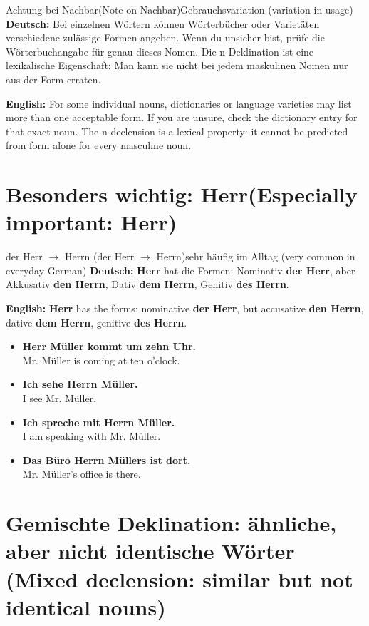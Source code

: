 \documentclass[a4paper,11pt]{article}
\newcommand{\GermanText}[1]{\textbf{Deutsch: }#1\par}
\newcommand{\EnglishText}[1]{{\small\color{SoftGray}\textbf{English: }#1\par}}
\newcommand{\ExampleItem}[2]{\item \textbf{#1}\\{\small\color{SoftGray}#2}}
\begin{document}
        \begin{grammarentry}{Achtung bei \glqq Nachbar\grqq \textnormal{(Note on \glqq Nachbar\grqq)}}{Gebrauchsvariation \textnormal{(variation in usage)}}
            \GermanText{Bei einzelnen Wörtern können Wörterbücher oder Varietäten verschiedene zulässige Formen angeben. Wenn du unsicher bist, prüfe die Wörterbuchangabe für genau dieses Nomen. Die n-Deklination ist eine lexikalische Eigenschaft: Man kann sie nicht bei jedem maskulinen Nomen nur aus der Form erraten.}
            \EnglishText{For some individual nouns, dictionaries or language varieties may list more than one acceptable form. If you are unsure, check the dictionary entry for that exact noun. The n-declension is a lexical property: it cannot be predicted from form alone for every masculine noun.}
        \end{grammarentry}

    \section{Besonders wichtig: \glqq Herr\grqq \textnormal{(Especially important: \glqq Herr\grqq)}}

        \begin{grammarentry}{der Herr $\rightarrow$ Herrn \textnormal{(der Herr $\rightarrow$ Herrn)}}{sehr häufig im Alltag \textnormal{(very common in everyday German)}}
            \GermanText{\textbf{Herr} hat die Formen: Nominativ \textbf{der Herr}, aber Akkusativ \textbf{den Herrn}, Dativ \textbf{dem Herrn}, Genitiv \textbf{des Herrn}.}
            \EnglishText{\textbf{Herr} has the forms: nominative \textbf{der Herr}, but accusative \textbf{den Herrn}, dative \textbf{dem Herrn}, genitive \textbf{des Herrn}.}
        \end{grammarentry}

        \begin{exbox}
            \begin{itemize}
                \ExampleItem{Herr Müller kommt um zehn Uhr.}{Mr. Müller is coming at ten o'clock.}
                \ExampleItem{Ich sehe Herrn Müller.}{I see Mr. Müller.}
                \ExampleItem{Ich spreche mit Herrn Müller.}{I am speaking with Mr. Müller.}
                \ExampleItem{Das Büro Herrn Müllers ist dort.}{Mr. Müller's office is there.}
            \end{itemize}
        \end{exbox}

    \section{Gemischte Deklination: ähnliche, aber nicht identische Wörter \textnormal{(Mixed declension: similar but not identical nouns)}}
\end{document}
